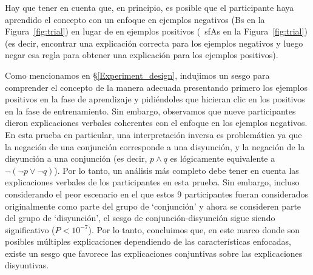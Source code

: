 Hay que tener en cuenta que, en principio, es posible que el participante haya aprendido el concepto con un enfoque en ejemplos negativos ({\sf B}s en la Figura~\ref{fig:trial}) en lugar de en ejemplos positivos ({\ sfA}s en la Figura~\ref{fig:trial}) (es decir, encontrar una explicación correcta para los ejemplos negativos y luego negar esa regla para obtener una explicación para los ejemplos positivos).

Como mencionamos en \S\ref{Experiment_design}, indujimos un sesgo para comprender el concepto de la manera adecuada presentando primero los ejemplos positivos en la fase de aprendizaje y pidiéndoles que hicieran clic en los positivos en la fase de entrenamiento. Sin embargo, observamos que nueve participantes dieron explicaciones verbales coherentes con el enfoque en los ejemplos negativos. En esta prueba en particular, una interpretación inversa es problemática ya que la negación de una conjunción corresponde a una disyunción, y la negación de la disyunción a una conjunción (es decir, $ p \land q $ es lógicamente equivalente a $ \lnot (\lnot p \lor \lnot q) $). Por lo tanto, un análisis más completo debe tener en cuenta las explicaciones verbales de los participantes en esta prueba. Sin embargo, incluso considerando el peor escenario en el que estos 9 participantes fueran considerados originalmente como parte del grupo de  `conjunción' y ahora se consideren parte del grupo de `disyunción', el sesgo de conjunción-disyunción sigue siendo significativo ($ P<10^{-7} $). Por lo tanto, concluimos que, en este marco donde son posibles múltiples explicaciones dependiendo de las características enfocadas, existe un sesgo que favorece las explicaciones conjuntivas sobre las explicaciones disyuntivas.

